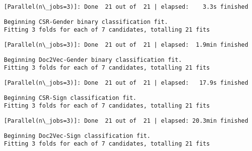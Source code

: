 \documentclass[11pt]{article}
\begin{document}
    \begin{Verbatim}[commandchars=\\\{\}]
[Parallel(n\_jobs=3)]: Done  21 out of  21 | elapsed:    3.3s finished

    \end{Verbatim}

    \begin{Verbatim}[commandchars=\\\{\}]
Beginning CSR-Gender binary classification fit.
Fitting 3 folds for each of 7 candidates, totalling 21 fits

    \end{Verbatim}

    \begin{Verbatim}[commandchars=\\\{\}]
[Parallel(n\_jobs=3)]: Done  21 out of  21 | elapsed:  1.9min finished

    \end{Verbatim}

    \begin{Verbatim}[commandchars=\\\{\}]
Beginning Doc2Vec-Gender binary classification fit.
Fitting 3 folds for each of 7 candidates, totalling 21 fits

    \end{Verbatim}

    \begin{Verbatim}[commandchars=\\\{\}]
[Parallel(n\_jobs=3)]: Done  21 out of  21 | elapsed:   17.9s finished

    \end{Verbatim}

    \begin{Verbatim}[commandchars=\\\{\}]
Beginning CSR-Sign classification fit.
Fitting 3 folds for each of 7 candidates, totalling 21 fits

    \end{Verbatim}

    \begin{Verbatim}[commandchars=\\\{\}]
[Parallel(n\_jobs=3)]: Done  21 out of  21 | elapsed: 20.3min finished

    \end{Verbatim}

    \begin{Verbatim}[commandchars=\\\{\}]
Beginning Doc2Vec-Sign classification fit.
Fitting 3 folds for each of 7 candidates, totalling 21 fits

    \end{Verbatim}
\end{document}
